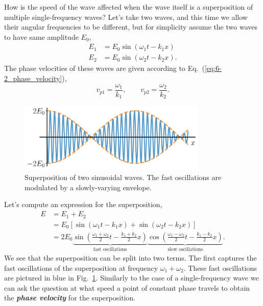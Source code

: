 How is the speed of the wave affected when the wave itself is a superposition of multiple single-frequency waves?
Let's take two waves, and this time we allow their angular frequencies to be different, but for simplicity assume the two waves to have same amplitude $E_0$,
\begin{align}
    E_1 & = E_0 \sin \left(\omega_1 t-k_1 x\right) \\
    E_2 & = E_0 \sin \left(\omega_2 t-k_2 x\right).
\end{align}
The phase velocities of these waves are given according to Eq.~(\ref{eq:6-2_phase_velocity}),
\begin{equation}
    v_{p1} = \frac{\omega_1}{k_1}, \qquad v_{p2} = \frac{\omega_2}{k_2}.
\end{equation}
\begin{figure}[t]
   \centering
    \includegraphics[width=0.8\textwidth]{lesson6/6-2_superpostion_velocity.pdf}    
        \caption[Group velocity]{Superposition of two sinusoidal waves. The fast oscillations are modulated by a slowly-varying envelope.}
        \label{fig:6-2_superposition}
\end{figure}
Let's compute an expression for the superposition,
\begin{align} 
    E & = E_{1} + E_{2} \nonumber\\
     & = E_{0}\left[\sin \left(\omega_{1} t-k_{1} x\right)+\sin \left(\omega_{2} t-k_{2} x\right)\right] \nonumber\\
    & = 2 E_{0} \underbrace{\sin \left( \frac{\omega_{1}+\omega_{2}}{2} t-\frac{k_{1}+k_{2}}{2} x \right)}_{\text{fast oscillations}} \underbrace{ \cos \left( \frac{\omega_{1}-\omega_{2}}{2} t-\frac{k_{1}-k_{2}}{2} x \right)}_{\text{slow oscillations}}.
\end{align}
We see that the superposition can be split into two terms.
The first captures the fast oscillations of the superposition at frequency $\omega_1+\omega_2$.
These fast oscillations are pictured in blue in Fig.~\ref{fig:6-2_superposition}.
Similarly to the case of a single-frequency wave we can ask the question at what speed a point of constant phase travels to obtain the \textit{\textbf{phase velocity}} for the superposition.
